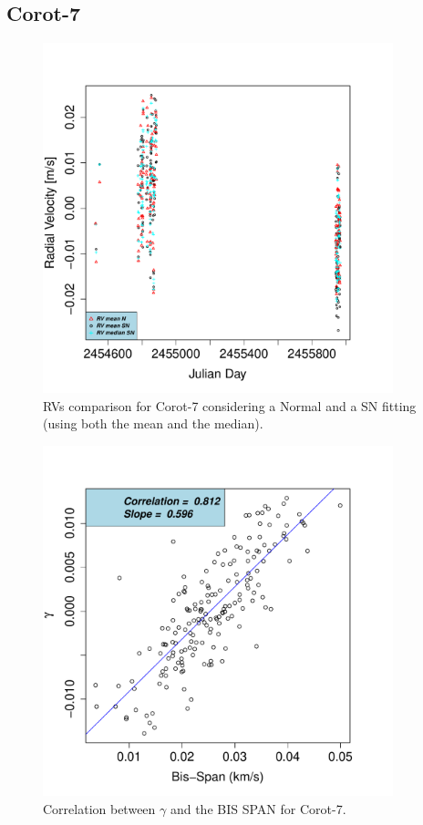 \documentclass[11pt, oneside]{article}
\begin{document}
\subsection{Corot-7}  \label{sec:Corot7}
%
\begin{figure}[htbp]
   \centering
\includegraphics[height = 4in]{[0]LRa01_E_vs_time.pdf} 
   \caption{RVs comparison for Corot-7 considering a Normal and a SN fitting (using both the mean and the median).}
   \label{fig:corot7:RV}
\end{figure}
%
\begin{figure}[htbp]
   \centering
\includegraphics[height = 4in]{LRa01_E_[2]gamma_vs_bisspan.pdf} 
   \caption{Correlation between $\gamma$ and the BIS SPAN for Corot-7.}
   \label{fig:Corot7:corr.gamma}
\end{figure}
\end{document}
